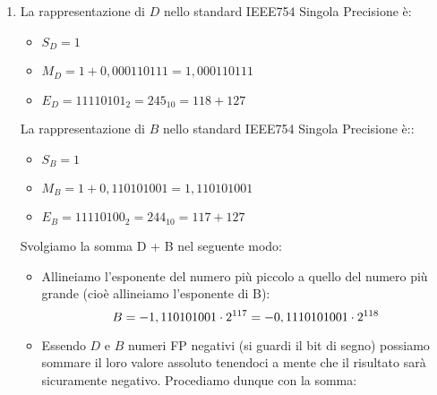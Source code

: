 \documentclass{article}
\begin{document}
\begin{enumerate}
    \newpage
    
    \item La rappresentazione di $D$ nello standard IEEE754 Singola Precisione è:
    \begin{itemize}
        \item[] $S_{D}=1$
        \item[] $M_{D}=1+0,000110111=1,000110111$
        \item[] $E_{D}=11110101_{2}=245_{10}=118+127$
    \end{itemize}
    La rappresentazione di $B$ nello standard IEEE754 Singola Precisione è::
    \begin{itemize}
        \item[] $S_{B}=1$
        \item[] $M_{B}=1+0,110101001=1,110101001$
        \item[] $E_{B}=11110100_{2}=244_{10}=117+127$
    \end{itemize}
    Svolgiamo la somma D + B nel seguente modo:
    \begin{itemize}
        \item Allineiamo l'esponente del numero pi\`u piccolo a quello del numero pi\`u grande (cio\`e allineiamo l'esponente di B):
$$B=-1,110101001\cdot2\textsuperscript{117}=-0,1110101001\cdot2\textsuperscript{118}$$
        \item Essendo $D$ e $B$ numeri FP negativi (si guardi il bit di segno) possiamo sommare il loro valore assoluto tenendoci a mente che il risultato sarà sicuramente negativo. Procediamo dunque con la somma:
        \begin{center}
\end{center}
\end{itemize}
\end{enumerate}
\end{document}

